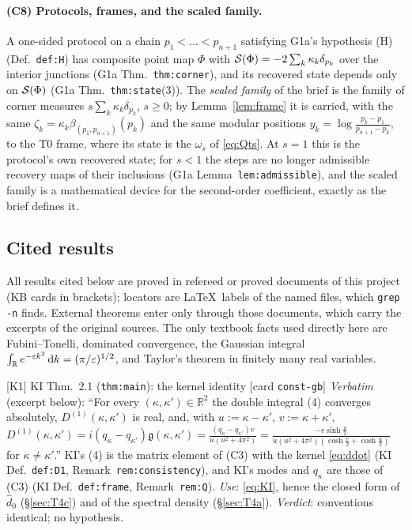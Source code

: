 \documentclass[11pt]{article}
\theoremstyle{definition}\newtheorem{hypothesis}[theorem]{Hypothesis}
\begin{document}
\paragraph{(C8) Protocols, frames, and the scaled family.}
A one-sided protocol on a chain $p_1<\dots<p_{n+1}$ satisfying G1a's hypothesis (H)
(Def.~\texttt{def:H}) has composite point map $\Phi$ with $\mathcal S(\Phi)=-2\sum_k\kappa_k\delta_{p_k}$
over the interior junctions (G1a Thm.~\texttt{thm:corner}), and its recovered state depends only on
$\mathcal S(\Phi)$ (G1a Thm.~\texttt{thm:state}(3)).  The \emph{scaled family} of the brief is the family of
corner measures $s\sum_k\kappa_k\delta_{p_k}$, $s\ge0$; by Lemma~\ref{lem:frame} it is carried, with the
same $\zeta_k=\kappa_k\beta_{(p_1,p_{n+1})}(p_k)$ and the same modular positions
$y_k=\log\frac{p_k-p_1}{p_{n+1}-p_k}$, to the T0 frame, where its state is the $\omega_s$ of
\eqref{eq:Qts}.  At $s=1$ this is the protocol's own recovered state; for $s<1$ the steps are no longer
admissible recovery maps of their inclusions (G1a Lemma~\texttt{lem:admissible}), and the scaled family is
a mathematical device for the second-order coefficient, exactly as the brief defines it.
\subsection{Cited results}\label{sec:cited}
All results cited below are proved in refereed or proved documents of this project (KB cards in
brackets); locators are \LaTeX\ labels of the named files, which \texttt{grep -n} finds.  External
theorems enter only through those documents, which carry the excerpts of the original sources.  The
only textbook facts used directly here are Fubini--Tonelli, dominated convergence, the Gaussian
integral $\int_{\mathbb R}e^{-\varepsilon k^2}\,\mathrm d k=(\pi/\varepsilon)^{1/2}$, and Taylor's theorem in finitely many
real variables.

\begin{citedbox}{[K1] KI Thm.~2.1 (\texttt{thm:main}): the kernel identity [card \texttt{const-gb}]}
\emph{Verbatim} (excerpt below): ``For every $(\kappa,\kappa')\in\mathbb R^2$ the double integral (4)
converges absolutely, $D^{(1)}(\kappa,\kappa')$ is real, and, with $u:=\kappa-\kappa'$,
$v:=\kappa+\kappa'$, $D^{(1)}(\kappa,\kappa')=i(q_\kappa-q_{\kappa'})\mathfrak g(\kappa,\kappa')
=\frac{(q_\kappa-q_{\kappa'})v}{u(u^2+4\pi^2)}=\frac{-v\sinh\frac u2}{u(u^2+4\pi^2)(\cosh\frac v2+\cosh\frac
u2)}$ for $\kappa\ne\kappa'$.''  KI's (4) is the matrix element of (C3) with the kernel
\eqref{eq:ddot} (KI Def.~\texttt{def:D1}, Remark~\texttt{rem:consistency}), and KI's modes and $q_\kappa$
are those of (C3) (KI Def.~\texttt{def:frame}, Remark~\texttt{rem:Q}).  \emph{Use}: \eqref{eq:KI}, hence
the closed form of $\hat d_0$ (\S\ref{sec:T4c}) and of the spectral density (\S\ref{sec:T4a}).
\emph{Verdict}: conventions identical; no hypothesis.
\end{citedbox}
\end{document}
